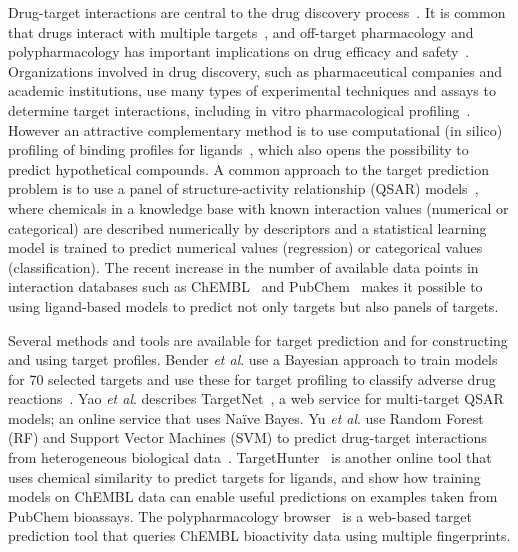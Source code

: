 \documentclass[utf8]{frontiersSCNS} %
\begin{document}
Drug-target interactions are central to the drug discovery
process~\cite{Yildirim:2007vh}. It is common that drugs interact with multiple
targets~\cite{hopkins2008network}, and off-target pharmacology and
polypharmacology has important implications on drug efficacy and
safety~\cite{Peters:2013yg,Ravikumar:2018qd}. Organizations involved in drug
discovery, such as pharmaceutical companies and academic institutions, use many
types of experimental techniques and assays to determine target interactions,
including in vitro pharmacological profiling~\cite{Bowes2012}. However an
attractive complementary method is to use computational (in silico) profiling
of binding profiles for ligands~\cite{Cereto-Massague:2015px}, which also opens the possibility
to predict hypothetical compounds. A common approach to the target prediction
problem is to use a panel of structure-activity relationship (QSAR)
models~\cite{HanschQSAR}, where chemicals in a knowledge base with known
interaction values (numerical or categorical) are described numerically by
descriptors and a statistical learning model is trained to predict numerical
values (regression) or categorical values (classification). The recent increase
in the number of available data points in interaction databases such as ChEMBL~\cite{Gaulton:2017tm} and
PubChem~\cite{Wang:2017cy} makes it possible to using ligand-based models to predict not only targets but also panels of targets.

Several methods and tools are available for target prediction and for
constructing and using target profiles.
%
Bender \textit{et al}. use a Bayesian approach to train models for 70 selected targets
and use these for target profiling to classify adverse drug
reactions~\cite{Bender:2007ib}.
%
Yao \textit{et al}. describes TargetNet~\cite{Yao:2016ij}, a web service for
multi-target QSAR models; an online service that uses Na\"ive Bayes.
%
Yu \textit{et al}. use Random Forest (RF) and Support Vector Machines (SVM) to predict
drug-target interactions from heterogeneous biological data~\cite{Yu:2012ol}.
%
TargetHunter~\cite{Wang:2013le} is another online tool that uses chemical
similarity to predict targets for ligands, and show how training models on
ChEMBL data can enable useful predictions on examples taken from PubChem
bioassays.
%
The polypharmacology browser~\cite{Awale:2017is} is a web-based target
prediction tool that queries ChEMBL bioactivity data using multiple
fingerprints.
\end{document}
